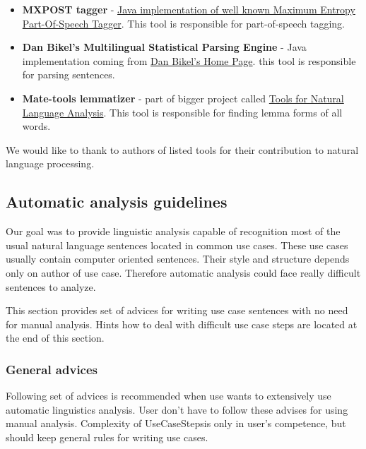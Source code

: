 \begin{itemize}
\item {\bf MXPOST tagger} - \href{http://www.inf.ed.ac.uk/resources/nlp/local_doc/MXPOST.html}{Java implementation of well known Maximum Entropy Part-Of-Speech Tagger}. This tool is responsible for part-of-speech tagging.
\item {\bf Dan Bikel's Multilingual Statistical Parsing Engine } - Java implementation coming from \href{http://www.cis.upenn.edu/~dbikel/software.html#stat-parser}{Dan Bikel’s Home Page}. this tool is responsible for parsing sentences.
\item {\bf Mate-tools lemmatizer} - part of bigger project called \href{http://code.google.com/p/mate-tools/}{Tools for Natural Language Analysis}. This tool is responsible for finding lemma forms of all words.
\end{itemize}

We would like to thank to authors of listed tools for their contribution to natural language processing.

\subsection{Automatic analysis guidelines}

Our goal was to provide linguistic analysis capable of recognition most of the usual natural language sentences located in common use cases. These use cases usually contain computer oriented sentences. Their style and structure depends only on author of use case. Therefore automatic analysis could face really difficult sentences to analyze.

This section provides set of advices for writing use case sentences with no need for manual analysis. Hints how to deal with difficult use case steps are located at the end of this section.

\subsubsection{General advices}
Following set of advices is recommended when use wants to extensively use automatic linguistics analysis. User don't have to follow these advises for using manual analysis. Complexity of UseCaseStepsis only in user's competence, but should keep general rules for writing use cases. 

